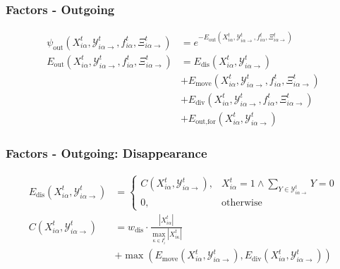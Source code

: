 \begin{frame}[plain]
    \frametitle{Factors - Outgoing}
    \begin{align*}
        \psi_{\mathrm{out}}(X_{i\alpha}^t, \mathcal{Y}_{i\alpha\rightarrow}^{t}, f_{i\alpha}^t,
        \Xi_{i\alpha\rightarrow}^{t}) &=
        e^{-E_{\mathrm{out}}(X_{i\alpha}^t, \mathcal{Y}_{i\alpha\rightarrow}^{t}, f_{i\alpha}^t, \Xi_{i\alpha\rightarrow}^{t})} \\
        E_{\mathrm{out}}(X_{i\alpha}^t, \mathcal{Y}_{i\alpha\rightarrow}^{t}, f_{i\alpha}^t,
        \Xi_{i\alpha\rightarrow}^{t}) &= E_{\text{dis}}(X_{i\alpha}^t,
        \mathcal{Y}_{i\alpha\rightarrow}^{t}) \\ \nonumber
        &+ E_{\text{move}}(X_{i\alpha}^t, \mathcal{Y}_{i\alpha\rightarrow}^{t}, f_{i\alpha}^t,
        \Xi_{i\alpha\rightarrow}^{t}) \\ \nonumber
        &+ E_{\text{div}}(X_{i\alpha}^t, \mathcal{Y}_{i\alpha\rightarrow}^{t}, f_{i\alpha}^t,
        \Xi_{i\alpha\rightarrow}^{t}) \\ \nonumber
        &+ E_{\text{out,for}}(X_{i\alpha}^t, \mathcal{Y}_{i\alpha\rightarrow}^{t})
    \end{align*}
\end{frame}


\begin{frame}[plain]
    \frametitle{Factors - Outgoing: Disappearance}
    \begin{align*}
        E_{\mathrm{dis}}(X_{i\alpha}^t,  \mathcal{Y}_{i\alpha\rightarrow}^{t}) &=
        \begin{cases}
            C(X_{i\alpha}^t, \mathcal{Y}_{i\alpha\rightarrow}^{t}), & X_{i\alpha}^t = 1 \wedge
            \sum_{Y\in\mathcal{Y}_{i\alpha\rightarrow}^{t}}Y = 0 \\
            0, & \text{otherwise}
        \end{cases} \\
        C(X_{i\alpha}^t, \mathcal{Y}_{i\alpha\rightarrow}^{t}) &= w_{\mathrm{dis}} \cdot
        \frac{|X_{i\alpha}^t|} {\max_{\kappa \in I_i^t}|X_{i\kappa}^t|} \\
        &+ \max\left(E_{\text{move}}(X_{i\alpha}^t, \mathcal{Y}_{i\alpha\rightarrow}^{t}), E_{\text{div}}(X_{i\alpha}^t, \mathcal{Y}_{i\alpha\rightarrow}^{t})\right)
    \end{align*}
\end{frame}


